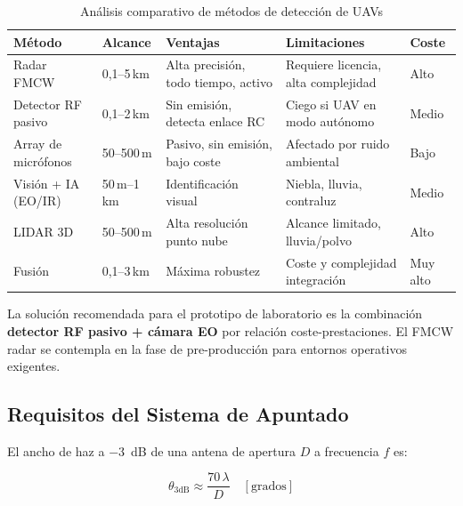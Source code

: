 \documentclass[12pt,a4paper]{article}
\begin{document}
\begin{table}[H]
\centering
\caption{Análisis comparativo de métodos de detección de UAVs}
\label{tab:deteccion}
\renewcommand{\arraystretch}{1.25}
\begin{tabularx}{\textwidth}{>{\hsize=0.6\hsize}X X X X l}
\toprule
\textbf{Método} &
\textbf{Alcance} &
\textbf{Ventajas} &
\textbf{Limitaciones} &
\textbf{Coste} \\
\midrule
Radar FMCW &
  0,1–5\,km &
  Alta precisión, todo tiempo, activo &
  Requiere licencia, alta complejidad &
  Alto \\[3pt]

Detector RF pasivo &
  0,1–2\,km &
  Sin emisión, detecta enlace RC &
  Ciego si UAV en modo autónomo &
  Medio \\[3pt]

Array de micrófonos &
  50–500\,m &
  Pasivo, sin emisión, bajo coste &
  Afectado por ruido ambiental &
  Bajo \\[3pt]

Visión + IA (EO/IR) &
  50\,m–1\,km &
  Identificación visual &
  Niebla, lluvia, contraluz &
  Medio \\[3pt]

LIDAR 3D &
  50–500\,m &
  Alta resolución punto nube &
  Alcance limitado, lluvia/polvo &
  Alto \\[3pt]

Fusión &
  0,1–3\,km &
  Máxima robustez &
  Coste y complejidad integración &
  Muy alto \\
\bottomrule
\end{tabularx}
\end{table}

\begin{notatec}
  La solución recomendada para el prototipo de laboratorio es la
  combinación \textbf{detector RF pasivo + cámara EO} por relación
  coste-prestaciones. El FMCW radar se contempla en la fase de
  pre-producción para entornos operativos exigentes.
\end{notatec}

\subsection{Requisitos del Sistema de Apuntado}

El ancho de haz a \SI{-3}{dB} de una antena de apertura $D$
a frecuencia $f$ es:

\begin{equation}
  \theta_{3\mathrm{dB}} \approx \frac{70\,\lambda}{D} \quad [\text{grados}]
  \label{eq:haz}
\end{equation}
\end{document}
